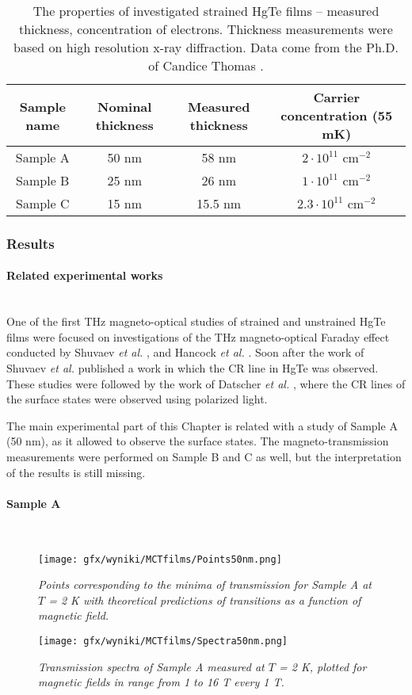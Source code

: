 \documentclass[titlepage,a4paper]{book}
\newcommand{\wciecie}{\quad\phantom{v}}
\newcommand{\myparagraph}[1]{\paragraph{#1}\mbox{}\\}
\begin{document}
\begin{table}[h]
\label{tab:MCT_films_properties}
\caption{The properties of investigated strained HgTe films -- measured thickness, concentration of electrons. Thickness measurements were based on high resolution x-ray diffraction. Data come from the Ph.D. of Candice Thomas \cite{Thomas_PhD}.}
\vspace{10pt}
\centering
\begin{tabular}{ c | c | c | c}	
\textbf{Sample name} & \textbf{Nominal thickness} & \textbf{Measured thickness} & \textbf{Carrier concentration (55 mK)}\\
\hline\hline
Sample A & 50 nm & 58 nm & $2\cdot10^{11}$ cm$^{-2}$\\ \hline
Sample B & 25 nm & 26 nm & $1\cdot10^{11}$ cm$^{-2}$\\ \hline
Sample C & 15 nm & 15.5 nm & $2.3\cdot10^{11}$ cm$^{-2}$\\ \hline
\hline 
\end{tabular}
\end{table}

\subsubsection{Results}
\myparagraph{Related experimental works}
\wciecie
One of the first THz magneto-optical studies of strained and unstrained HgTe films were focused on investigations of the THz magneto-optical Faraday effect conducted by Shuvaev \textit{et al.} \cite{Shuvaev_MCT_films2}\cite{Shuvaev_MCT_films3}, and Hancock \textit{et al.} \cite{Hancock_MCT_films}. Soon after the work of Shuvaev \textit{et al.} \cite{Shuvaev_MCT_films1} published a work in which the CR line in HgTe was observed. These studies were followed by the work of Datscher \textit{et al.} \cite{Ganichev_MCT_layers}, where the CR lines of the surface states were observed using polarized light.

The main experimental part of this Chapter is related with a study of Sample A (50 nm), as it allowed to observe the surface states. The magneto-transmission measurements were performed on Sample B and C as well, but the interpretation of the results is still missing. 

\clearpage
\myparagraph{Sample A}
\begin{figure}[H]
	\centering
	\texttt{[image: gfx/wyniki/MCTfilms/Points50nm.png]}
	\vspace{-10pt}
	\caption{\textit{Points corresponding to the minima of transmission for Sample A at $T$ = 2 K with theoretical predictions of transitions as a function of magnetic field. 
}}
	\label{fig:Points50nm}
\end{figure}
\begin{figure}[H]
	\centering
	\texttt{[image: gfx/wyniki/MCTfilms/Spectra50nm.png]}
	\vspace{-10pt}
	\caption{\textit{Transmission spectra of Sample A measured at $T$ = 2 K, plotted for magnetic fields in range from 1 to 16 T every 1 T.}}
	\label{fig:Spectra50nm}
\end{figure}
\end{document}
